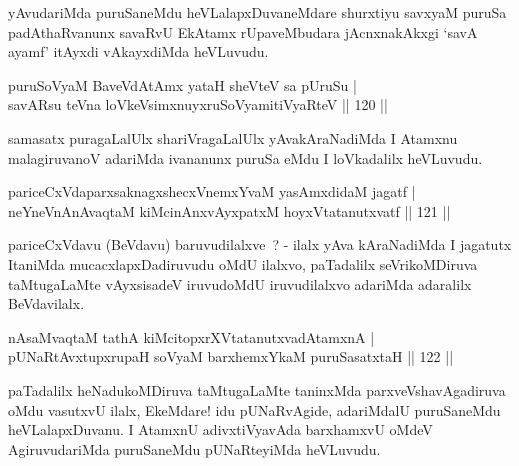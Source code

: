\begin{artha}
yAvudariMda puruSaneMdu heVLalapxDuvaneMdare shurxtiyu savxyaM puruSa padAthaRvanunx savaRvU EkAtamx rUpaveMbudara jAcnxnakAkxgi `savA ayamf' itAyxdi vAkayxdiMda heVLuvudu.
\end{artha}

\begin{shl}
puruSoV\s yaM BaveVdAtAmx yataH sheVteV sa pUruSu |\\
savARsu teVna loVkeV\s simxnuyxruSoV\s yamitiVyaRteV \hfill || 120 ||
\end{shl}

\begin{artha}
samasatx puragaLalUlx shariVragaLalUlx yAvakAraNadiMda I Atamxnu malagiruvanoV adariMda ivananunx puruSa eMdu I loVkadalilx heVLuvudu.
\end{artha}


\begin{shl}
pariceCxVdaparxsaknagxshecxVnemxYvaM yasAmxdidaM jagatf |\\
neYneVnAnAvaqtaM kiMcinAnxvAyxpatxM hoyxVtatanutxvatf \hfill || 121 ||
\end{shl}	

\begin{artha}
pariceCxVdavu (BeVdavu) baruvudilalxve~? - ilalx yAva kAraNadiMda I
jagatutx ItaniMda mucacxlapxDadiruvudu oMdU ilalxvo, paTadalilx
seVrikoMDiruva taMtugaLaMte vAyxsisadeV iruvudoMdU iruvudilalxvo
adariMda adaralilx BeVdavilalx.
\end{artha}

\begin{shl}
nAsaMvaqtaM tathA kiMcitopxrXVtatanutxvadAtamxnA |\\
pUNaRtAvxtupxrupaH soV\s yaM \footnotemark[1]barxhemxYkaM puruSasatxtaH \hfill || 122 ||
\end{shl}


\begin{artha}
paTadalilx heNadukoMDiruva taMtugaLaMte taninxMda parxveVshavAgadiruva oMdu vasutxvU ilalx, EkeMdare! idu pUNaRvAgide, adariMdalU puruSaneMdu heVLalapxDuvanu. I AtamxnU adivxtiVyavAda barxhamxvU oMdeV AgiruvudariMda puruSaneMdu pUNaRteyiMda heVLuvudu.
\end{artha}


